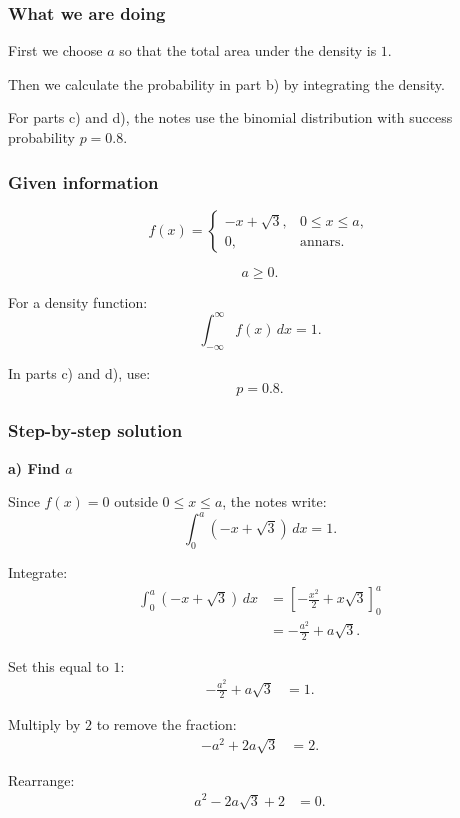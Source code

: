\documentclass[10pt]{article}
\begin{document}
\subsubsection*{What we are doing}

First we choose \(a\) so that the total area under
the density is \(1\).

Then we calculate the probability in part b) by
integrating the density.

For parts c) and d), the notes use the binomial
distribution with success probability \(p=0.8\).

\subsubsection*{Given information}

\[
f(x)=
\begin{cases}
-x+\sqrt{3},
& 0\le x\le a,\\
0,
& \text{annars}.
\end{cases}
\]

\[
a\ge 0.
\]

For a density function:
\[
\int_{-\infty}^{\infty} f(x)\,dx=1.
\]

In parts c) and d), use:
\[
p=0.8.
\]

\subsubsection*{Step-by-step solution}

\textbf{a) Find \(a\)}

Since \(f(x)=0\) outside \(0\le x\le a\), the notes
write:
\[
\int_0^a
(-x+\sqrt{3})\,dx
=1.
\]

Integrate:
\begin{align*}
\int_0^a
(-x+\sqrt{3})\,dx
&=
\left[
-\frac{x^2}{2}
+x\sqrt{3}
\right]_0^a
\\[2mm]
&=
-\frac{a^2}{2}
+a\sqrt{3}.
\end{align*}

Set this equal to \(1\):
\begin{align*}
-\frac{a^2}{2}
+a\sqrt{3}
&=1.
\end{align*}

Multiply by \(2\) to remove the fraction:
\begin{align*}
-a^2+2a\sqrt{3}
&=2.
\end{align*}

Rearrange:
\begin{align*}
a^2-2a\sqrt{3}+2
&=0.
\end{align*}
\end{document}
